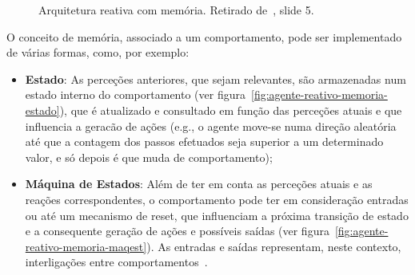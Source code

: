 \begin{figure}[H]
    \begin{center}
    \end{center}
    \caption{Arquitetura reativa com memória.
    Retirado de~\cite{isel:iasa:slides:arq-agentes-reativos-parte-3}, slide 5.}\label{fig:arquitetura-reativa-memoria}
\end{figure}

O conceito de memória, associado a um comportamento, pode ser implementado de várias formas, como, por exemplo:

\begin{itemize}
    \item \textbf{Estado}: As perceções anteriores, que sejam relevantes, são armazenadas num estado interno do comportamento (ver figura~\ref{fig:agente-reativo-memoria-estado}), que é atualizado e consultado em função das perceções atuais e que influencia a geracão de ações (e.g., o agente move-se numa direção aleatória até que a contagem dos passos efetuados seja superior a um determinado valor, e só depois é que muda de comportamento);
    \item \textbf{Máquina de Estados}: Além de ter em conta as perceções atuais e as reações correspondentes, o comportamento pode ter em consideração entradas ou até um mecanismo de reset, que influenciam a próxima transição de estado e a consequente geração de ações e possíveis saídas (ver figura~\ref{fig:agente-reativo-memoria-maqest}).
    As entradas e saídas representam, neste contexto, interligações entre comportamentos~\cite{isel:iasa:slides:arq-agentes-reativos-parte-3}.
\end{itemize}

